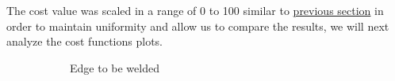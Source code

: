 The cost value was scaled in a range of 0 to 100 similar to \hyperref[sssec:tcpcst]{previous section} in order to maintain uniformity and allow us to compare the results, we will next analyze the cost functions plots.

\begin{figure}[!ht] %
	\centering
	\begin{subfigure}[b]{0.4\textwidth}
		\caption{Edge to be welded}  
		\label{fig:17a}
	\end{subfigure}
	\begin{subfigure}[b]{0.4\textwidth}

\end{subfigure}
\end{figure}
